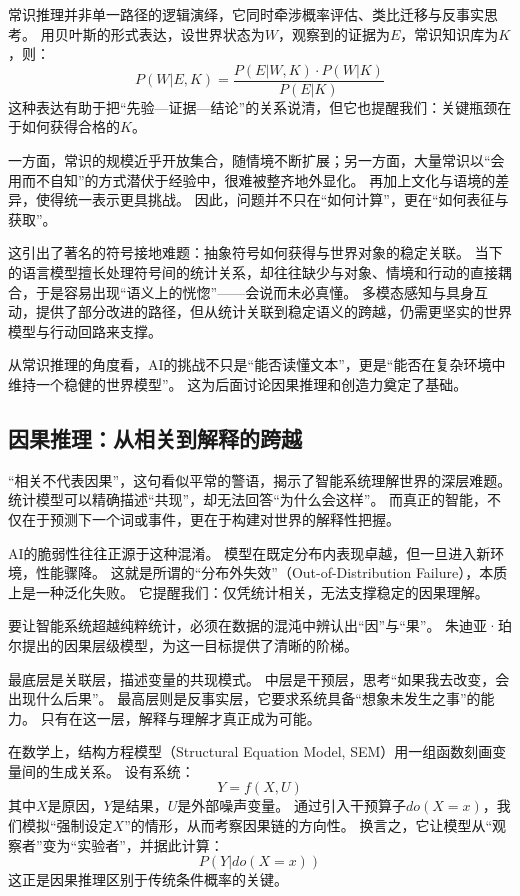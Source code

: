 常识推理并非单一路径的逻辑演绎，它同时牵涉概率评估、类比迁移与反事实思考。
用贝叶斯的形式表达，设世界状态为$W$，观察到的证据为$E$，常识知识库为$K$，则：
\begin{equation}
P(W|E, K) = \frac{P(E|W, K) \cdot P(W|K)}{P(E|K)}
\end{equation}
这种表达有助于把“先验—证据—结论”的关系说清，但它也提醒我们：关键瓶颈在于如何获得合格的$K$。

一方面，常识的规模近乎开放集合，随情境不断扩展；另一方面，大量常识以“会用而不自知”的方式潜伏于经验中，很难被整齐地外显化。
再加上文化与语境的差异，使得统一表示更具挑战。
因此，问题并不只在“如何计算”，更在“如何表征与获取”。

这引出了著名的符号接地难题：抽象符号如何获得与世界对象的稳定关联。
当下的语言模型擅长处理符号间的统计关系，却往往缺少与对象、情境和行动的直接耦合，于是容易出现“语义上的恍惚”——会说而未必真懂。
多模态感知与具身互动，提供了部分改进的路径，但从统计关联到稳定语义的跨越，仍需更坚实的世界模型与行动回路来支撑。

从常识推理的角度看，AI的挑战不只是“能否读懂文本”，更是“能否在复杂环境中维持一个稳健的世界模型”。
这为后面讨论因果推理和创造力奠定了基础。

\subsection{因果推理：从相关到解释的跨越}

“相关不代表因果”，这句看似平常的警语，揭示了智能系统理解世界的深层难题。
统计模型可以精确描述“共现”，却无法回答“为什么会这样”。
而真正的智能，不仅在于预测下一个词或事件，更在于构建对世界的解释性把握。

AI的脆弱性往往正源于这种混淆。
模型在既定分布内表现卓越，但一旦进入新环境，性能骤降。
这就是所谓的“分布外失效”（Out-of-Distribution Failure），本质上是一种泛化失败。
它提醒我们：仅凭统计相关，无法支撑稳定的因果理解。

要让智能系统超越纯粹统计，必须在数据的混沌中辨认出“因”与“果”。
朱迪亚·珀尔提出的因果层级模型，为这一目标提供了清晰的阶梯。

最底层是关联层，描述变量的共现模式。
中层是干预层，思考“如果我去改变，会出现什么后果”。
最高层则是反事实层，它要求系统具备“想象未发生之事”的能力。
只有在这一层，解释与理解才真正成为可能。

在数学上，结构方程模型（Structural Equation Model, SEM）用一组函数刻画变量间的生成关系。
设有系统：
\begin{equation}
Y = f(X, U)
\end{equation}
其中$X$是原因，$Y$是结果，$U$是外部噪声变量。
通过引入干预算子$do(X=x)$，我们模拟“强制设定$X$”的情形，从而考察因果链的方向性。
换言之，它让模型从“观察者”变为“实验者”，并据此计算：
\begin{equation}
P(Y|do(X=x))
\end{equation}
这正是因果推理区别于传统条件概率的关键。

